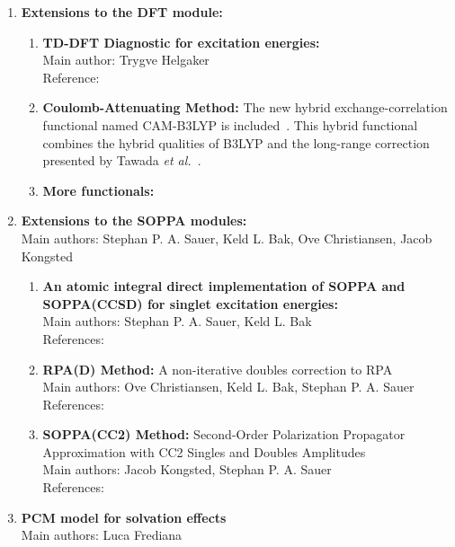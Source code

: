 \begin{enumerate}
\item{\bf Extensions to the DFT module:}
\begin{enumerate}
  \item{\bf TD-DFT Diagnostic for excitation energies:}  \\
   Main author: Trygve Helgaker \\
   Reference: \cite{mjgpbpthdjtjcp08}
  \item{\bf Coulomb-Attenuating Method:} The new hybrid
    exchange-correlation functional named CAM-B3LYP is
    included~\cite{tydptnchcpl393}. This hybrid functional  combines the
    hybrid qualities of B3LYP and the long-range correction presented by
    Tawada {\it et al.\/}~\cite{ytttsytykhjcp120}.
  \item{\bf More functionals:}
\end{enumerate}

\item{\bf Extensions to the SOPPA modules:} \\
Main authors: Stephan P. A. Sauer, Keld L. Bak, Ove Christiansen, Jacob Kongsted
\begin{enumerate}
  \item{\bf An atomic integral direct implementation of SOPPA and SOPPA(CCSD) for singlet excitation energies:}  \\
   Main authors: Stephan P. A. Sauer, Keld L. Bak \\
   References: \cite{spas037} \\
   \cite{spas089}
  \item{\bf RPA(D) Method:}
  A non-iterative doubles correction to RPA\\
   Main authors: Ove Christiansen, Keld L. Bak, Stephan P. A. Sauer \\
   References: \cite{spas025}
  \item{\bf SOPPA(CC2) Method:}
   Second-Order Polarization Propagator Approximation with CC2 Singles and Doubles
   Amplitudes\\
   Main authors: Jacob Kongsted, Stephan P. A. Sauer \\
   References: \cite{spas097}
\end{enumerate}

\item{\bf PCM model for solvation effects} \\
Main authors: Luca Frediana


\end{enumerate}
